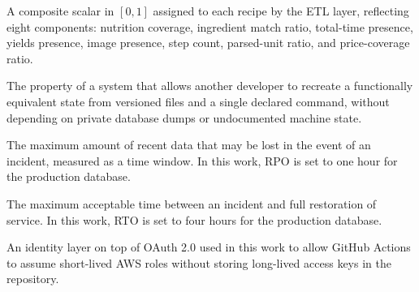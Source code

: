 \begin{description}[style=multiline, labelwidth=5cm, leftmargin=5.5cm]
  \item[Quality Score]
       A composite scalar in $[0, 1]$ assigned to each recipe by the ETL layer, reflecting eight components: nutrition coverage, ingredient match ratio, total-time presence, yields presence, image presence, step count, parsed-unit ratio, and price-coverage ratio.

  \item[Reproducible Bootstrap]
       The property of a system that allows another developer to recreate a functionally equivalent state from versioned files and a single declared command, without depending on private database dumps or undocumented machine state.

  \item[Recovery Point Objective]
       The maximum amount of recent data that may be lost in the event of an incident, measured as a time window. In this work, RPO is set to one hour for the production database.

  \item[Recovery Time Objective]
       The maximum acceptable time between an incident and full restoration of service. In this work, RTO is set to four hours for the production database.

  \item[OpenID Connect]
       An identity layer on top of OAuth 2.0 used in this work to allow GitHub Actions to assume short-lived AWS roles without storing long-lived access keys in the repository.

\end{description}

\clearpage
